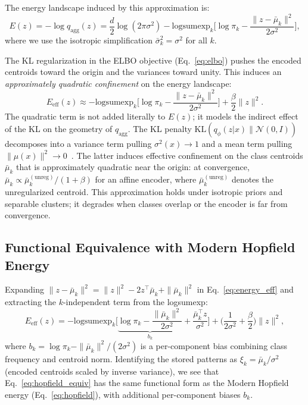\documentclass[11pt]{article}
\begin{document}
The energy landscape induced by this approximation is:
\begin{equation}
\label{eq:energy}
E(z) = -\log q_{\text{agg}}(z)
  = \frac{d}{2}\log(2\pi\sigma^2)
  - \mathrm{logsumexp}_k\Big[\log\pi_k
    - \frac{\|z - \bar{\mu}_k\|^2}{2\sigma^2}\Big],
\end{equation}
where we use the isotropic simplification $\bar{\sigma}_k^2 = \sigma^2$
for all $k$.

The KL regularization in the ELBO objective (Eq.~\ref{eq:elbo}) pushes
the encoded centroids toward the origin and the variances toward unity.
This induces an \emph{approximately quadratic confinement} on the energy
landscape:
\begin{equation}
\label{eq:energy_eff}
E_{\text{eff}}(z) \approx
  -\mathrm{logsumexp}_k\Big[\log\pi_k
    - \frac{\|z - \bar{\mu}_k\|^2}{2\sigma^2}\Big]
  + \frac{\beta}{2}\|z\|^2.
\end{equation}
The quadratic term is not added literally to $E(z)$; it models the indirect
effect of the KL on the geometry of $q_{\text{agg}}$.
The KL penalty $\mathrm{KL}(q_\phi(z|x) \| \mathcal{N}(0,I))$ decomposes
into a variance term pulling $\sigma^2(x) \to 1$ and a mean term pulling
$\|\mu(x)\|^2 \to 0$~\citep{dai2019diagnosing}.
The latter induces effective confinement on the class centroids $\bar{\mu}_k$
that is approximately quadratic near the origin: at convergence,
$\bar{\mu}_k \propto \bar{\mu}_k^{(\text{unreg})} / (1 + \beta)$ for an
affine encoder, where $\bar{\mu}_k^{(\text{unreg})}$ denotes the unregularized
centroid.
This approximation holds under isotropic priors and separable clusters;
it degrades when classes overlap or the encoder is far from convergence.


\subsection{Functional Equivalence with Modern Hopfield Energy}
\label{sec:equivalence}

Expanding $\|z - \bar{\mu}_k\|^2 = \|z\|^2 - 2z^\top\bar{\mu}_k
+ \|\bar{\mu}_k\|^2$ in Eq.~\ref{eq:energy_eff} and extracting the
$k$-independent term from the logsumexp:
\begin{equation}
\label{eq:hopfield_equiv}
E_{\text{eff}}(z) =
  -\mathrm{logsumexp}_k\Big[
    \underbrace{\log\pi_k - \frac{\|\bar{\mu}_k\|^2}{2\sigma^2}}_{b_k}
    + \frac{\bar{\mu}_k^\top z}{\sigma^2}
  \Big]
  + \Big(\frac{1}{2\sigma^2} + \frac{\beta}{2}\Big)\|z\|^2,
\end{equation}
where $b_k = \log\pi_k - \|\bar{\mu}_k\|^2/(2\sigma^2)$ is a per-component
bias combining class frequency and centroid norm.
Identifying the stored patterns as $\xi_k = \bar{\mu}_k / \sigma^2$
(encoded centroids scaled by inverse variance), we see that
Eq.~\ref{eq:hopfield_equiv} has the same functional form as the Modern
Hopfield energy (Eq.~\ref{eq:hopfield}), with additional per-component
biases $b_k$.
\end{document}
